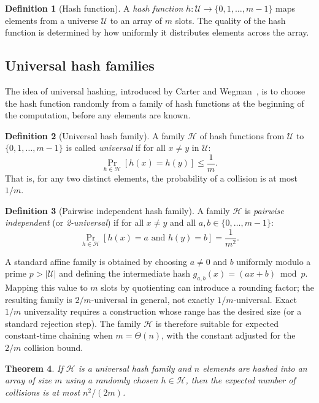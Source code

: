 \documentclass[twoside,12pt]{book}
\theoremstyle{plain}
\newtheorem{theorem}{Theorem}[chapter]
\theoremstyle{definition}
\newtheorem{definition}[theorem]{Definition}
\theoremstyle{remark}
\begin{document}
\begin{definition}[Hash function]
A \emph{hash function} $h: \mathcal{U} \to \{0, 1, \ldots, m-1\}$ maps elements from a universe $\mathcal{U}$ to an array of $m$ slots. The quality of the hash function is determined by how uniformly it distributes elements across the array.
\end{definition}

\subsection{Universal hash families}

The idea of universal hashing, introduced by Carter and Wegman~\cite{carter1979}, is to choose the hash function randomly from a family of hash functions at the beginning of the computation, before any elements are known.

\begin{definition}[Universal hash family]
A family $\mathcal{H}$ of hash functions from $\mathcal{U}$ to $\{0, 1, \ldots, m-1\}$ is called \emph{universal} if for all $x \neq y$ in $\mathcal{U}$:
\[
\Pr_{h \in \mathcal{H}}[h(x) = h(y)] \leq \frac{1}{m}.
\]
That is, for any two distinct elements, the probability of a collision is at most $1/m$.
\end{definition}

\begin{definition}[Pairwise independent hash family]
A family $\mathcal{H}$ is \emph{pairwise independent} (or \emph{2-universal}) if for all $x \neq y$ and all $a, b \in \{0, \ldots, m-1\}$:
\[
\Pr_{h \in \mathcal{H}}[h(x) = a \text{ and } h(y) = b] = \frac{1}{m^2}.
\]
\end{definition}

A standard affine family is obtained by choosing $a\neq0$ and $b$ uniformly
modulo a prime $p>|\mathcal U|$ and defining the intermediate hash
$g_{a,b}(x)=(ax+b)\bmod p$.  Mapping this value to $m$ slots by quotienting
can introduce a rounding factor; the resulting family is $2/m$-universal in
general, not exactly $1/m$-universal.  Exact $1/m$ universality requires a
construction whose range has the desired size (or a standard rejection step).
The family $\mathcal{H}$ is therefore suitable for expected constant-time
chaining when $m=\Theta(n)$, with the constant adjusted for the $2/m$
collision bound.

\begin{theorem}\label{thm:universal-hash}
If $\mathcal{H}$ is a universal hash family and $n$ elements are hashed into an array of size $m$ using a randomly chosen $h \in \mathcal{H}$, then the expected number of collisions is at most $n^2/(2m)$.
\end{theorem}
\end{document}
